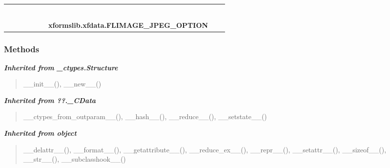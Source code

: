     \label{xformslib:xfdata:FLIMAGE_JPEG_OPTION}
\begin{tabular}{cccccccccc}
\multicolumn{2}{r}{\settowidth{\BCL}{object}\multirow{2}{\BCL}{object}}
&&
&&
&&
  \\\cline{3-3}
  &&\multicolumn{1}{c|}{}
&&
&&
&&
  \\
\multicolumn{4}{r}{\settowidth{\BCL}{??.\_CData}\multirow{2}{\BCL}{??.\_CData}}
&&
&&
  \\\cline{5-5}
  &&&&\multicolumn{1}{c|}{}
&&
&&
  \\
\multicolumn{6}{r}{\settowidth{\BCL}{\_ctypes.Structure}\multirow{2}{\BCL}{\_ctypes.Structure}}
&&
  \\\cline{7-7}
  &&&&&&\multicolumn{1}{c|}{}
&&
  \\
&&&&&&\multicolumn{2}{l}{\textbf{xformslib.xfdata.FLIMAGE\_JPEG\_OPTION}}
\end{tabular}



  \subsubsection{Methods}


\large{\textbf{\textit{Inherited from \_ctypes.Structure}}}

\begin{quote}
\_\_init\_\_(), \_\_new\_\_()
\end{quote}

\large{\textbf{\textit{Inherited from ??.\_CData}}}

\begin{quote}
\_\_ctypes\_from\_outparam\_\_(), \_\_hash\_\_(), \_\_reduce\_\_(), \_\_setstate\_\_()
\end{quote}

\large{\textbf{\textit{Inherited from object}}}

\begin{quote}
\_\_delattr\_\_(), \_\_format\_\_(), \_\_getattribute\_\_(), \_\_reduce\_ex\_\_(), \_\_repr\_\_(), \_\_setattr\_\_(), \_\_sizeof\_\_(), \_\_str\_\_(), \_\_subclasshook\_\_()
\end{quote}

